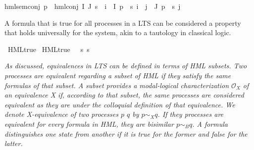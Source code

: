 \begin{isabellebody}
hml{\isacharunderscore}{\kern0pt}sem{\isacharunderscore}{\kern0pt}conj{\isacharcolon}{\kern0pt}\ {\isacartoucheopen}{\isacharparenleft}{\kern0pt}p\ {\isasymTurnstile}\ {\isacharparenleft}{\kern0pt}hml{\isacharunderscore}{\kern0pt}conj\ I\ J\ {\isasympsi}s{\isacharparenright}{\kern0pt}{\isacharparenright}{\kern0pt}\ {\isacharequal}{\kern0pt}\ {\isacharparenleft}{\kern0pt}{\isacharparenleft}{\kern0pt}{\isasymforall}i\ {\isasymin}\ I{\isachardot}{\kern0pt}\ p\ {\isasymTurnstile}\ {\isacharparenleft}{\kern0pt}{\isasympsi}s\ i{\isacharparenright}{\kern0pt}{\isacharparenright}{\kern0pt}\ {\isasymand}\ {\isacharparenleft}{\kern0pt}{\isasymforall}j\ {\isasymin}\ J{\isachardot}{\kern0pt}\ {\isasymnot}{\isacharparenleft}{\kern0pt}p\ {\isasymTurnstile}\ {\isacharparenleft}{\kern0pt}{\isasympsi}s\ j{\isacharparenright}{\kern0pt}{\isacharparenright}{\kern0pt}{\isacharparenright}{\kern0pt}{\isacharparenright}{\kern0pt}{\isacartoucheclose}%
\begin{isamarkuptext}%
A formula that is true for all processes in a LTS can be considered a property that holds universally for the system, akin to a tautology in classical logic.%
\end{isamarkuptext}\isamarkuptrue%
\isamarkupfalse%
\ HML{\isacharunderscore}{\kern0pt}true\ \isanewline
{\isachardoublequoteopen}HML{\isacharunderscore}{\kern0pt}true\ {\isasymphi}\ {\isasymequiv}\ {\isasymforall}s{\isachardot}{\kern0pt}\ s\ {\isasymTurnstile}\ {\isasymphi}{\isachardoublequoteclose}\isanewline
%
\isadelimproof
%
\endisadelimproof
%
\isatagproof
%
\endisatagproof
{\isafoldproof}%
%
\isadelimproof
%
\endisadelimproof
%
\isadelimdocument
%
\endisadelimdocument
%
\isatagdocument
%
\isamarkuptrue%
%
\endisatagdocument
{\isafolddocument}%
%
\isadelimdocument
%
\endisadelimdocument
%
\begin{isamarkuptext}%
\textit{As discussed, equivalences in LTS can be defined in terms of \textsf{HML} subsets. Two processes are equivalent regarding a subset of HML if they satisfy the same formulas of that subset. 
A subset provides a \textnormal{modal-logical characterization $\mathcal{O}_X$} of an equivalence X if, according to that subset, the same processes are considered equivalent as they are under the colloquial definition of that equivalence.
We denote \textnormal{X-equivalence} of two processes $p$ $q$ by $p \sim_X q$. If they processes are equivalent for every formula in HML, they are bisimilar $p \sim_B q$. A formula \textnormal{distinguishes} one state from another if it is true for the former and false for the latter.}%

\end{isamarkuptext}
\end{isabellebody}
